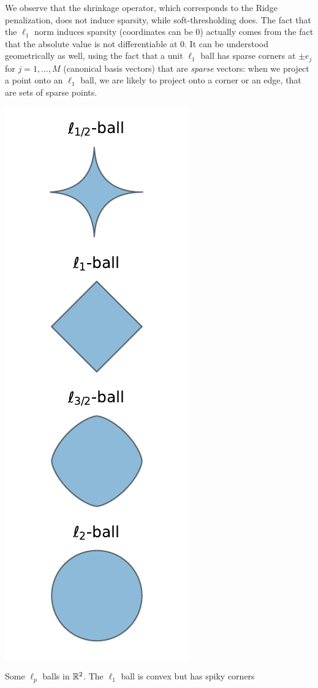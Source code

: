 We observe that the shrinkage operator, which corresponds to the Ridge penalization, does not induce sparsity, while soft-thresholding does.
The fact that the $\ell_1$ norm induces sparsity (coordinates can be 0) actually comes from the fact that the absolute value is not differentiable at $0$.
It can be understood geometrically as well, using the fact that a unit $\ell_1$ ball has sparse corners at $\pm e_j$ for $j=1, \ldots, M$ (canonical basis vectors) that are \emph{sparse} vectors: when we project a point onto an $\ell_1$ ball, we are likely to project onto a corner or an edge, that are sets of sparse points.
\begin{marginfigure}
	\includegraphics{assets/balls.pdf}
	\caption{Some $\ell_p$ balls in $\mathbb R^2$. The $\ell_1$ ball is convex but has spiky corners}
	\label{fig:balls}
\end{marginfigure}

